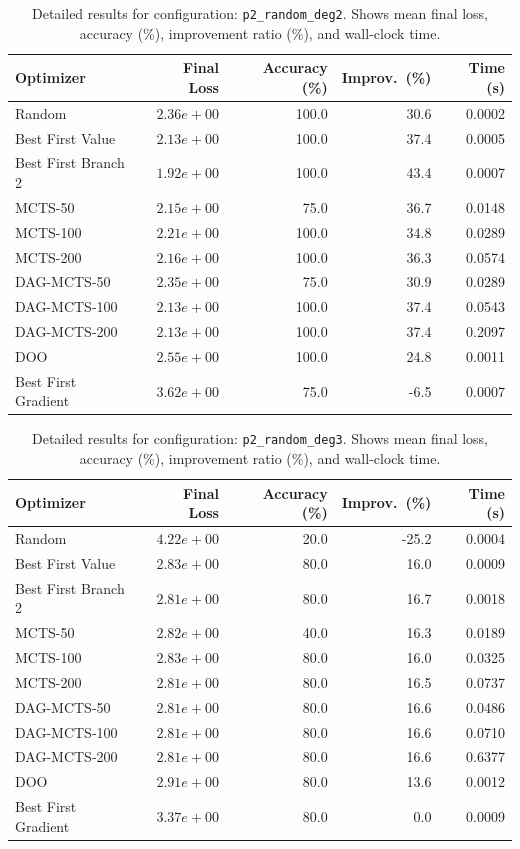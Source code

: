 \begin{table}[H]
\centering
\caption{Detailed results for configuration: \texttt{p2\_random\_deg2}. Shows mean final loss, accuracy (\%), improvement ratio (\%), and wall-clock time.}
\label{tab:funclearn-detail-7}
\begin{tabular}{lrrrr}
\toprule
Optimizer & Final Loss & Accuracy (\%) & Improv.~(\%) & Time (s) \\
\midrule
Random & $2.36e+00$ & 100.0 & 30.6 & 0.0002 \\
\hline
Best First Value & $2.13e+00$ & 100.0 & 37.4 & 0.0005 \\
\hline
Best First Branch 2 & \textbf{$1.92e+00$} & 100.0 & 43.4 & 0.0007 \\
\hline
MCTS-50 & $2.15e+00$ & 75.0 & 36.7 & 0.0148 \\
\hline
MCTS-100 & $2.21e+00$ & 100.0 & 34.8 & 0.0289 \\
\hline
MCTS-200 & $2.16e+00$ & 100.0 & 36.3 & 0.0574 \\
\hline
DAG-MCTS-50 & $2.35e+00$ & 75.0 & 30.9 & 0.0289 \\
\hline
DAG-MCTS-100 & $2.13e+00$ & 100.0 & 37.4 & 0.0543 \\
\hline
DAG-MCTS-200 & $2.13e+00$ & 100.0 & 37.4 & 0.2097 \\
\hline
DOO & $2.55e+00$ & 100.0 & 24.8 & 0.0011 \\
\hline
Best First Gradient & $3.62e+00$ & 75.0 & -6.5 & 0.0007 \\
\bottomrule
\end{tabular}
\end{table}

\begin{table}[H]
\centering
\caption{Detailed results for configuration: \texttt{p2\_random\_deg3}. Shows mean final loss, accuracy (\%), improvement ratio (\%), and wall-clock time.}
\label{tab:funclearn-detail-8}
\begin{tabular}{lrrrr}
\toprule
Optimizer & Final Loss & Accuracy (\%) & Improv.~(\%) & Time (s) \\
\midrule
Random & $4.22e+00$ & 20.0 & -25.2 & 0.0004 \\
\hline
Best First Value & $2.83e+00$ & 80.0 & 16.0 & 0.0009 \\
\hline
Best First Branch 2 & \textbf{$2.81e+00$} & 80.0 & 16.7 & 0.0018 \\
\hline
MCTS-50 & $2.82e+00$ & 40.0 & 16.3 & 0.0189 \\
\hline
MCTS-100 & $2.83e+00$ & 80.0 & 16.0 & 0.0325 \\
\hline
MCTS-200 & $2.81e+00$ & 80.0 & 16.5 & 0.0737 \\
\hline
DAG-MCTS-50 & $2.81e+00$ & 80.0 & 16.6 & 0.0486 \\
\hline
DAG-MCTS-100 & $2.81e+00$ & 80.0 & 16.6 & 0.0710 \\
\hline
DAG-MCTS-200 & $2.81e+00$ & 80.0 & 16.6 & 0.6377 \\
\hline
DOO & $2.91e+00$ & 80.0 & 13.6 & 0.0012 \\
\hline
Best First Gradient & $3.37e+00$ & 80.0 & 0.0 & 0.0009 \\
\bottomrule
\end{tabular}
\end{table}


